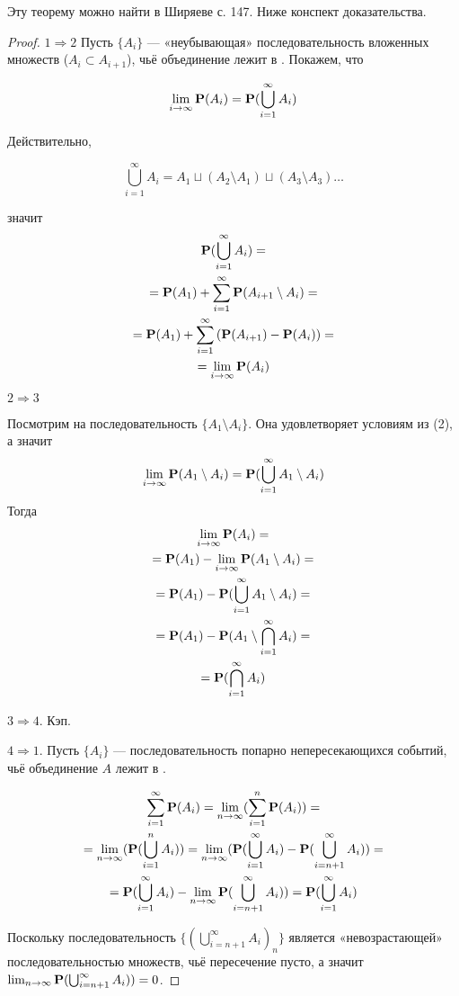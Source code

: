 Эту теорему можно найти в Ширяеве с. 147. %
Ниже конспект доказательства.
\begin{proof}
$1\Rightarrow 2$ Пусть $\{A_i\}$ --- «неубывающая» последовательность вложенных множеств ($A_i \subset A_{i+1}$), чьё объединение лежит в \Alg. Покажем, что

$$\lim_{i\rightarrow\infty}\mathbf{P}(A_i)=\mathbf{P}(\bigcup_{i=1}^\infty A_i)$$

Действительно, 

$$\bigcup_{i=1}^\infty A_i = A_1 \sqcup (A_2\setminus A_1) \sqcup (A_3\setminus A_3) \ldots$$

значит
\begin{multline}
	\mathbf{P}(\bigcup_{i=1}^\infty A_i)=\\
	=\mathbf{P}(A_1) + \sum_{i=1}^\infty \mathbf{P}(A_{i+1}\setminus A_i)=\\
	=\mathbf{P}(A_1) + \sum_{i=1}^\infty\left(\mathbf{P}(A_{i+1}) - \mathbf{P}(A_i)\right) = \\
	=\lim_{i\rightarrow\infty}\mathbf{P}(A_i)
\end{multline}

$2 \Rightarrow 3$ 

Посмотрим на последовательность $\{A_1\setminus A_i\}$. Она удовлетворяет условиям из (2), а значит
$$\lim_{i\rightarrow\infty}\mathbf{P}(A_1\setminus A_i) = \mathbf{P}(\bigcup_{i=1}^\infty A_1\setminus A_i)$$
Тогда
\begin{multline}
\lim_{i\rightarrow\infty}\mathbf{P}(A_i) =\\
= \mathbf{P}(A_1) - \lim_{i\rightarrow\infty}\mathbf{P}(A_1\setminus A_i) =\\
= \mathbf{P}(A_1) - \mathbf{P}(\bigcup_{i=1}^\infty A_1\setminus A_i) = \\
= \mathbf{P}(A_1) - \mathbf{P}(A_1\setminus \bigcap_{i=1}^\infty A_i) = \\
= \mathbf{P}(\bigcap_{i=1}^\infty A_i)
\end{multline}

$3 \Rightarrow 4$. Кэп.

$4 \Rightarrow 1$. Пусть $\{A_i\}$ --- последовательность попарно непересекающихся событий, чьё объединение $A$ лежит в \Alg.

\begin{multline}
\sum_{i=1}^\infty\mathbf{P}(A_i) = \lim_{n\rightarrow\infty}(\sum_{i = 1}^n\mathbf{P}(A_i)) = \\
= \lim_{n\rightarrow\infty}(\mathbf{P}(\bigcup_{i=1}^n A_i)) 
=  \lim_{n\rightarrow\infty}(\mathbf{P}(\bigcup_{i = 1}^\infty A_i)-\mathbf{P}(\bigcup_{i = n + 1}^\infty A_i)) =\\
= \mathbf{P}(\bigcup_{i = 1}^\infty A_i) - \lim_{n\rightarrow\infty}\mathbf{P}(\bigcup_{i = n + 1}^\infty A_i)) = \mathbf{P}(\bigcup_{i = 1}^\infty A_i)
\end{multline} 

Поскольку последовательность $\{(\bigcup_{i = n + 1}^\infty A_i)_n\}$ является «невозрастающей» последовательностью множеств, чьё пересечение пусто, а значит $\lim_{n\rightarrow\infty}\mathbf{P}(\bigcup_{i = n + 1}^\infty A_i)) = 0$.

\end{proof}